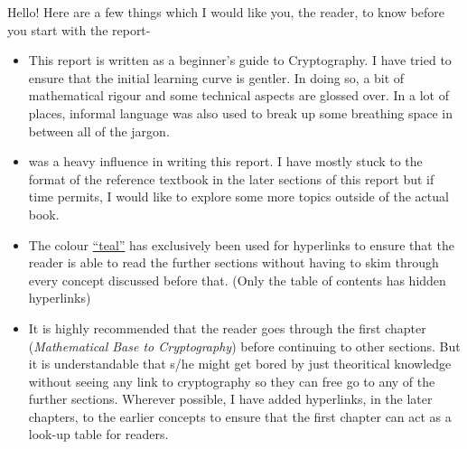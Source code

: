 \label{chap:Auth_note}
	
	\begin{tcolorbox}[colback=MustardAddicted!5!white,colframe=MustardAddicted!75!black]
		\small Hello! \vspace{0.5cm}
		Here are a few things which I would like you, the reader, to know before you start with the report-
		\begin{itemize}
			\item This report is written as a beginner's guide to Cryptography. I have tried to ensure that the initial learning curve is gentler. In doing so, a bit of mathematical rigour and some technical aspects are glossed over. In a lot of places, informal language was also used to break up some breathing space in between all of the jargon.
			\item \cite{Silverman} was a heavy influence in writing this report. I have mostly stuck to the format of the reference textbook in the later sections of this report but if time permits, I would like to explore some more topics outside of the actual book.
			\item The colour \hyperref[chap:Auth_note]{``teal''} has exclusively been used for hyperlinks to ensure that the reader is able to read the further sections without having to skim through every concept discussed before that. (Only the table of contents has hidden hyperlinks)
			\item It is highly recommended that the reader goes through the first chapter (\emph{Mathematical Base to Cryptography}) before continuing to other sections. But it is understandable that s/he might get bored by just theoritical knowledge without seeing any link to cryptography so they can free go to any of the further sections. Wherever possible, I have added hyperlinks, in the later chapters, to the earlier concepts to ensure that the first chapter can act as a look-up table for readers.
		\end{itemize}
	\end{tcolorbox}

